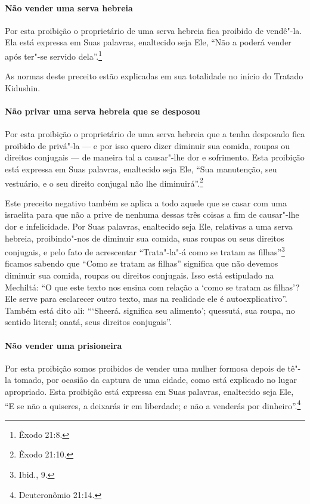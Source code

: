 \begin{multicols}{2}
\paragraph{Não vender uma serva hebreia}

Por esta proibição o proprietário de uma serva hebreia fica proibido de
vendê"-la. Ela está expressa em Suas palavras, enaltecido seja Ele, ``Não
a poderá vender após ter"-se servido dela''.\footnote{Êxodo 21:8.}

As normas deste preceito estão explicadas em sua totalidade no início
do Tratado Kidushin\starr.

\paragraph{Não privar uma serva hebreia que se desposou}

Por esta proibição o proprietário de uma serva hebreia que a tenha
desposado fica proibido de privá"-la --- e por isso quero dizer diminuir
sua comida, roupas ou direitos conjugais --- de maneira tal a
causar"-lhe dor e sofrimento. Esta proibição está expressa em Suas
palavras, enaltecido seja Ele, ``Sua manutenção, seu vestuário, e o seu
direito conjugal não lhe diminuirá''.\footnote{Êxodo 21:10.}

Este preceito negativo também se aplica a todo aquele que se casar com
uma israelita para que não a prive de nenhuma dessas três coisas a fim
de causar"-lhe dor e infelicidade. Por Suas palavras, enaltecido seja Ele,
relativas a uma serva hebreia, proibindo"-nos de diminuir sua comida,
suas roupas ou seus direitos conjugais, e pelo fato de acrescentar
``Trata"-la"-á como se tratam as filhas''\footnote{Ibid., 9.} ficamos sabendo que
``Como se tratam as filhas'' significa que não devemos diminuir sua
comida, roupas ou direitos conjugais. Isso está estipulado na Mechiltá\starr:
``O que este texto nos ensina com relação a `como se tratam as filhas'?
Ele serve para esclarecer outro texto, mas na realidade ele é
autoexplicativo''. Também está dito ali: ```Sheerá\starr.
significa seu alimento'; quessutá\starr, sua roupa, no sentido literal;
onatá\starr, seus direitos conjugais''.

\paragraph{Não vender uma prisioneira}

Por esta proibição somos proibidos de vender uma mulher formosa depois
de tê"-la tomado, por ocasião da captura de uma cidade, como está
explicado no lugar apropriado. Esta proibição está expressa em Suas
palavras, enaltecido seja Ele, ``E se não a quiseres, a deixarás ir em
liberdade; e não a venderás por dinheiro''.\footnote{Deuteronômio 21:14.}


\end{multicols}

